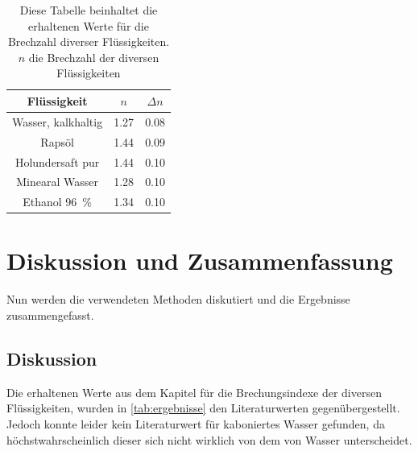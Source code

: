 \documentclass[11pt,ngerman]{scrartcl}
\begin{document}
\begin{table}[H]
    \centering
    \caption{Diese Tabelle beinhaltet die erhaltenen Werte für
        die Brechzahl diverser Flüssigkeiten. \\
    $n$ die Brechzahl der diversen Flüssigkeiten \\
}
    \label{tab:ausgewertet}
    \begin{tabular}{c|S|S}
        Flüssigkeit          & {$n$} & {$\Delta n$} \\ \hline
        Wasser, kalkhaltig   & 1.27  & 0.08         \\
        Rapsöl               & 1.44  & 0.09         \\
        Holundersaft pur     & 1.44  & 0.10         \\
        Minearal Wasser      & 1.28  & 0.10         \\
        Ethanol \SI{96}{\percent}      & 1.34  & 0.10         \\
    \end{tabular}
\end{table}

\section{Diskussion und Zusammenfassung}
\label{sec:diskussion_zusammenfassung}

Nun werden die verwendeten Methoden diskutiert und die Ergebnisse 
zusammengefasst.

\subsection{Diskussion}
Die erhaltenen Werte aus dem Kapitel  
für die Brechungsindexe der diversen Flüssigkeiten, wurden
in \autoref{tab:ergebnisse} den Literaturwerten gegenübergestellt.
Jedoch konnte leider kein Literaturwert für kaboniertes Wasser 
gefunden, da höchstwahrscheinlich dieser sich nicht wirklich von
dem von Wasser unterscheidet.
\end{document}

